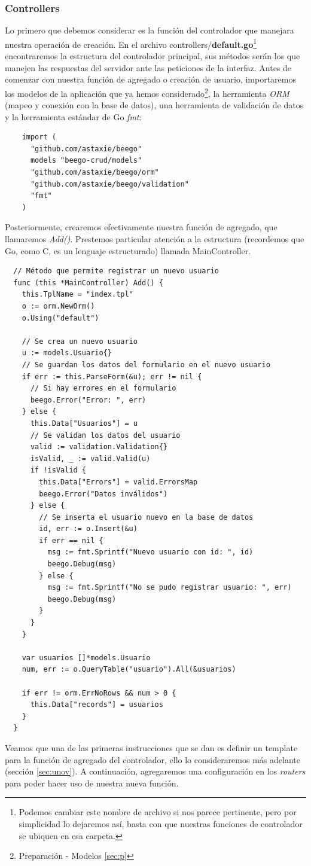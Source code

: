 \documentclass[12pt]{article}
\begin{document}
\subsubsection{Controllers}
Lo primero que debemos considerar es la función del controlador que manejara
nuestra operación de creación. En el archivo controllers/\textbf{default.go}\footnote{Podemos cambiar este nombre de archivo si nos parece pertinente, pero por simplicidad lo dejaremos así, basta con que nuestras funciones de controlador se ubiquen en esa carpeta.}
encontraremos la estructura del controlador principal, sus métodos serán los que
manejen las respuestas del servidor ante las peticiones de la interfaz.
Antes de comenzar con nuestra función de agregado o creación de usuario, importaremos
los modelos de la aplicación que ya hemos considerado\footnote{Preparación - Modelos \ref{sec:p}},
la herramienta \textit{ORM} (mapeo y conexión con la base de datos), una herramienta de validación
de datos y la herramienta estándar de Go \textit{fmt}:
\label{sec:imp}
\begin{verbatim}
    import (
      "github.com/astaxie/beego"
      models "beego-crud/models"
      "github.com/astaxie/beego/orm"
      "github.com/astaxie/beego/validation"
      "fmt"
    )
\end{verbatim}
Posteriormente, crearemos efectivamente nuestra función de agregado, que
llamaremos \textit{Add()}. Prestemos particular atención a la estructura (recordemos
que Go, como C, es un lenguaje estructurado) llamada MainController.
\begin{verbatim}
  // Método que permite registrar un nuevo usuario
  func (this *MainController) Add() {
    this.TplName = "index.tpl"
    o := orm.NewOrm()
    o.Using("default")

    // Se crea un nuevo usuario
    u := models.Usuario{}
    // Se guardan los datos del formulario en el nuevo usuario
    if err := this.ParseForm(&u); err != nil {
      // Si hay errores en el formulario
      beego.Error("Error: ", err)
    } else {
      this.Data["Usuarios"] = u
      // Se validan los datos del usuario
      valid := validation.Validation{}
      isValid, _ := valid.Valid(u)
      if !isValid {
        this.Data["Errors"] = valid.ErrorsMap
        beego.Error("Datos inválidos")
      } else {
        // Se inserta el usuario nuevo en la base de datos
        id, err := o.Insert(&u)
        if err == nil {
          msg := fmt.Sprintf("Nuevo usuario con id: ", id)
          beego.Debug(msg)
        } else {
          msg := fmt.Sprintf("No se pudo registrar usuario: ", err)
          beego.Debug(msg)
        }
      }
    }

    var usuarios []*models.Usuario
    num, err := o.QueryTable("usuario").All(&usuarios)

    if err != orm.ErrNoRows && num > 0 {
      this.Data["records"] = usuarios
    }
  }
\end{verbatim}
Veamos que una de las primeras instrucciones que se dan es definir un template
para la función de agregado del controlador, ello lo consideraremos más adelante (sección \ref{sec:unov}).
A continuación, agregaremos una configuración en los \textit{routers} para poder
hacer uso de nuestra nueva función.
\end{document}
